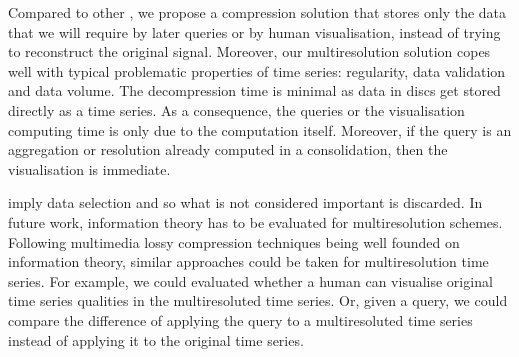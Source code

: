 Compared to other , we propose a compression solution that
stores only the data that we will require by later queries or by
human visualisation, instead of trying to reconstruct the original
signal.  Moreover, our multiresolution solution copes well with
typical problematic properties of time series: regularity, data
validation and data volume.  The decompression time is minimal as data
in discs get stored directly as a time series. As a consequence, the
queries or the visualisation computing time is only due to the
computation itself. Moreover, if the query is an aggregation or
resolution already computed in a  consolidation, then the
visualisation is immediate.


 imply data selection and so what is not considered
important is discarded.  In future work, information theory has to be
evaluated for multiresolution schemes. Following multimedia lossy
compression techniques being well founded on information theory,
similar approaches could be taken for multiresolution time series. For
example, we could evaluated whether a human can visualise original
time series qualities in the multiresoluted time series. Or, given a
query, we could compare the difference of applying the query to a
multiresoluted time series instead of applying it to the original time
series.





